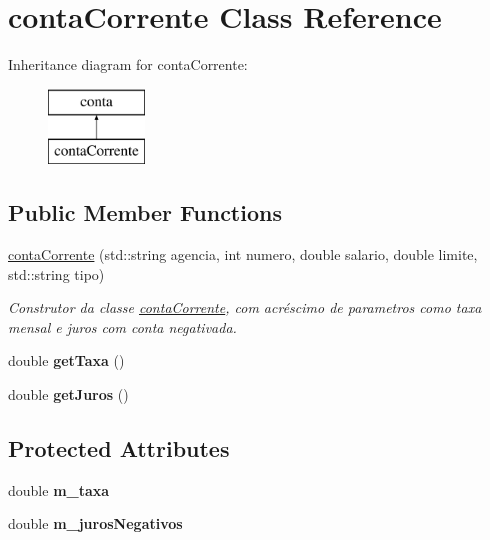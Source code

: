 \hypertarget{classcontaCorrente}{}\section{conta\+Corrente Class Reference}
\label{classcontaCorrente}
Inheritance diagram for conta\+Corrente\+:\begin{figure}[H]
\begin{center}
\leavevmode
\includegraphics[height=2.000000cm]{classcontaCorrente}
\end{center}
\end{figure}
\subsection*{Public Member Functions}
\begin{DoxyCompactItemize}
\item 
\mbox{\hyperlink{classcontaCorrente_a393be16c11b3a9344a53836d105dc86b}{conta\+Corrente}} (std\+::string agencia, int numero, double salario, double limite, std\+::string tipo)
\begin{DoxyCompactList}\small\item\em Construtor da classe \mbox{\hyperlink{classcontaCorrente}{conta\+Corrente}}, com acréscimo de parametros como taxa mensal e juros com conta negativada. \end{DoxyCompactList}\item 
\mbox{\label{classcontaCorrente_a867791d6abba96136df8de7bfea206dc}} 
double {\bfseries get\+Taxa} ()
\item 
\mbox{\label{classcontaCorrente_a946d90c596d765b991624f61d1557b25}} 
double {\bfseries get\+Juros} ()
\end{DoxyCompactItemize}
\subsection*{Protected Attributes}
\begin{DoxyCompactItemize}
\item 
\mbox{\label{classcontaCorrente_a34fafd5b236735ff728c8f7e9d4028bf}} 
double {\bfseries m\+\_\+taxa}
\item 
\mbox{\label{classcontaCorrente_a59e9f193d2be5b57b92651b61792933e}} 
double {\bfseries m\+\_\+juros\+Negativos}
\end{DoxyCompactItemize}


